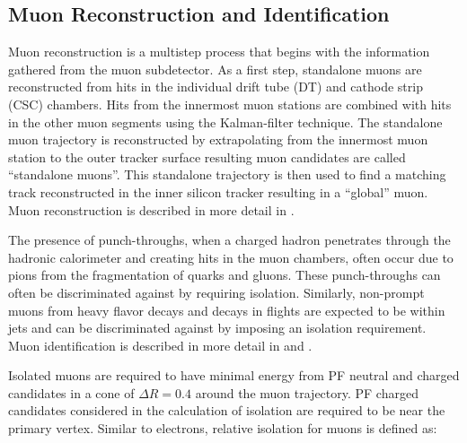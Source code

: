 \subsection{Muon Reconstruction and Identification}\label{ss:muonreco}

Muon reconstruction is a multistep process that begins with the information gathered from the muon subdetector. As a
first step, standalone muons are reconstructed from hits in the individual drift tube (DT) and
cathode strip (CSC) chambers. Hits from the innermost muon stations are combined with hits in the other muon segments
using the Kalman-filter technique. The standalone muon trajectory is reconstructed by extrapolating from the
innermost muon station to the outer tracker surface resulting muon candidates are called ``standalone muons''. 
This standalone trajectory is then used to find a matching track reconstructed in the inner silicon tracker resulting 
in a ``global'' muon. Muon reconstruction is described in more detail in \cite{CMS_MUO_10-004}.


The presence of punch-throughs, when a charged hadron penetrates through the hadronic calorimeter and creating hits 
in the muon chambers, often occur due to pions from the fragmentation of quarks and gluons. These punch-throughs 
can often be discriminated against by requiring isolation. Similarly, non-prompt muons from heavy flavor decays and 
decays in flights are expected to be within jets and can be discriminated against by imposing an isolation requirement. 
Muon identification is described in more detail in \cite{CMS_MUO_10-004} and \cite{CMS_MUO_11-001}.

Isolated muons are required to have minimal energy from PF neutral and charged candidates in a cone of $\Delta R =
0.4$ around the muon trajectory. PF charged candidates considered in the calculation of isolation are required to be near the 
primary vertex. Similar to electrons, relative isolation for muons is defined as:

